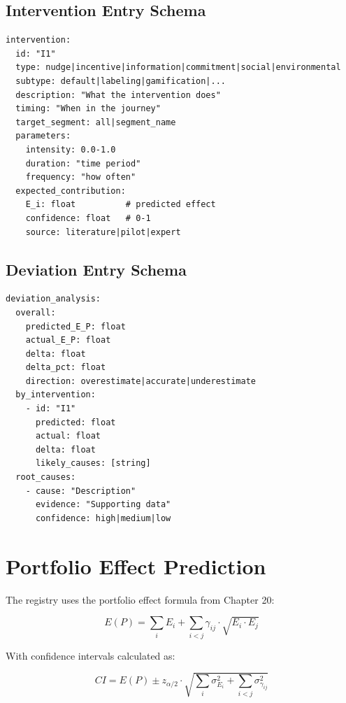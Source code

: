 \subsection{Intervention Entry Schema}

\begin{verbatim}
intervention:
  id: "I1"
  type: nudge|incentive|information|commitment|social|environmental
  subtype: default|labeling|gamification|...
  description: "What the intervention does"
  timing: "When in the journey"
  target_segment: all|segment_name
  parameters:
    intensity: 0.0-1.0
    duration: "time period"
    frequency: "how often"
  expected_contribution:
    E_i: float          # predicted effect
    confidence: float   # 0-1
    source: literature|pilot|expert
\end{verbatim}

\subsection{Deviation Entry Schema}

\begin{verbatim}
deviation_analysis:
  overall:
    predicted_E_P: float
    actual_E_P: float
    delta: float
    delta_pct: float
    direction: overestimate|accurate|underestimate
  by_intervention:
    - id: "I1"
      predicted: float
      actual: float
      delta: float
      likely_causes: [string]
  root_causes:
    - cause: "Description"
      evidence: "Supporting data"
      confidence: high|medium|low
\end{verbatim}

\section{Portfolio Effect Prediction}

The registry uses the portfolio effect formula from Chapter 20:

\begin{equation}
E(P) = \sum_{i} E_i + \sum_{i<j} \gamma_{ij} \cdot \sqrt{E_i \cdot E_j}
\end{equation}

With confidence intervals calculated as:

\begin{equation}
CI = E(P) \pm z_{\alpha/2} \cdot \sqrt{\sum_i \sigma^2_{E_i} + \sum_{i<j} \sigma^2_{\gamma_{ij}}}
\end{equation}

